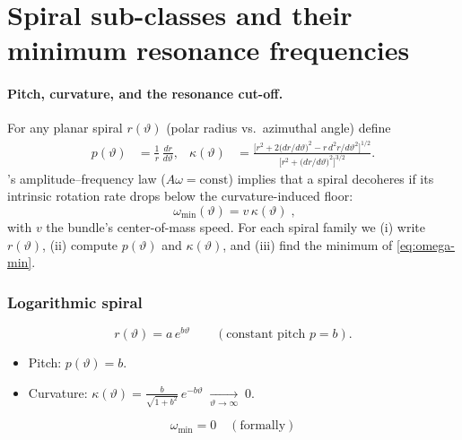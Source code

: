 \section*{Spiral sub-classes and their minimum resonance frequencies}

\paragraph{Pitch, curvature, and the resonance cut-off.}
For any planar spiral \(r(\vartheta)\) (polar radius vs.\ azimuthal angle) define
\begin{align}
  p(\vartheta)
  &= \frac{1}{r}\,\frac{dr}{d\vartheta},
  &
  \kappa(\vartheta)
  &= \frac{\bigl[r^{2} + 2\bigl(dr/d\vartheta\bigr)^{2} - r\,d^{2}r/d\vartheta^{2}\bigr]^{1/2}}
           {\bigl[r^{2} + \bigl(dr/d\vartheta\bigr)^{2}\bigr]^{3/2}}.
\end{align}
\RCM’s amplitude–frequency law (\(A\omega=\mathrm{const}\)) implies that a spiral decoheres if its intrinsic rotation rate drops below the curvature-induced floor:
\begin{equation}
  \boxed{\;\omega_{\min}(\vartheta)=v\,\kappa(\vartheta)\;},
  \label{eq:omega-min}
\end{equation}
with \(v\) the bundle’s center-of-mass speed. For each spiral family we (i) write \(r(\vartheta)\), (ii) compute \(p(\vartheta)\) and \(\kappa(\vartheta)\), and (iii) find the minimum of \eqref{eq:omega-min}.

\subsubsection*{Logarithmic spiral}

\begin{equation}
  r(\vartheta) = a\,e^{b\vartheta} \qquad (\text{constant pitch } p=b).
\end{equation}

\begin{itemize}[leftmargin=1.5em]
  \item Pitch: \(p(\vartheta)=b\).
  \item Curvature: \(\displaystyle \kappa(\vartheta)
           = \frac{b}{\sqrt{1+b^{2}}}\,e^{-b\vartheta}
           \;\xrightarrow[\vartheta\to\infty]{}\;0.\)
\end{itemize}

\begin{equation}
  \boxed{\;\omega_{\min}=0 \quad (\text{formally})\;}
\end{equation}

